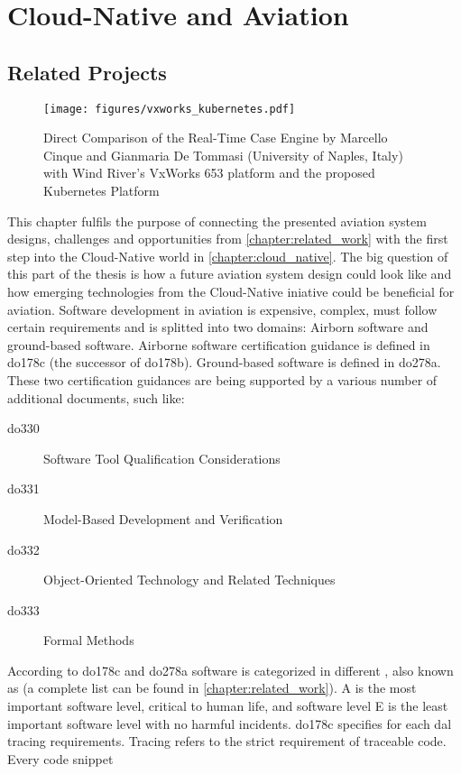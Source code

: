 \documentclass[titlepage]{report}
\begin{document}
\chapter{Cloud-Native and Aviation}\label{chapter:cloud_native_and_aviation}
\section{Related Projects}
\begin{figure}[H]
  \centering
  \texttt{[image: figures/vxworks\_kubernetes.pdf]}
  \caption{Direct Comparison of the Real-Time Case Engine by Marcello Cinque and Gianmaria De Tommasi (University of Naples, Italy) with Wind River's VxWorks 653 platform and the proposed Kubernetes Platform\cite{cinque2017work}\cite{VXWorks653}\cite{VXWorks653Platform}}\label{fig:vxworks_kubernetes}
\end{figure}
This chapter fulfils the purpose of connecting the presented aviation system designs, challenges and opportunities from \autoref{chapter:related_work} with the first step into the Cloud-Native world in \autoref{chapter:cloud_native}.
The big question of this part of the thesis is how a future aviation system design could look like and how emerging technologies from the Cloud-Native iniative could be beneficial for aviation. Software development in aviation is expensive,
complex, must follow certain requirements and is splitted into two domains: Airborn software and ground-based software. Airborne software certification guidance is defined in \gls{do178c} (the successor of \gls{do178b}).
Ground-based software is defined in \gls{do278a}. These two certification guidances are being supported by a various number of additional documents, such like:
\begin{description}
  \item[\gls{do330}] Software Tool Qualification Considerations
  \item[\gls{do331}] Model-Based Development and Verification
  \item[\gls{do332}] Object-Oriented Technology and Related Techniques
  \item[\gls{do333}] Formal Methods
\end{description}
According to \gls{do178c} and \gls{do278a} software is categorized in different , also known as  (a complete list can be found in \autoref{chapter:related_work}). A is the most important software level, critical to
human life, and software level E is the least important software level with no harmful incidents. \gls{do178c} specifies for each \gls{dal} tracing requirements. Tracing refers to the strict requirement of traceable code. Every code snippet
\end{document}
